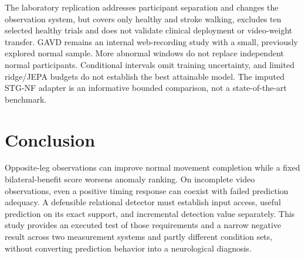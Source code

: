 \documentclass[letterpaper]{article}
\begin{document}
The laboratory replication addresses participant separation and changes the observation system, but covers only healthy and stroke walking, excludes ten selected healthy trials and does not validate clinical deployment or video-weight transfer. GAVD remains an internal web-recording study with a small, previously explored normal sample. More abnormal windows do not replace independent normal participants. Conditional intervals omit training uncertainty, and limited ridge/JEPA budgets do not establish the best attainable model. The imputed STG-NF adapter is an informative bounded comparison, not a state-of-the-art benchmark.

\section{Conclusion}

Opposite-leg observations can improve normal movement completion while a fixed bilateral-benefit score worsens anomaly ranking. On incomplete video observations, even a positive timing response can coexist with failed prediction adequacy. A defensible relational detector must establish input access, useful prediction on its exact support, and incremental detection value separately. This study provides an executed test of those requirements and a narrow negative result across two measurement systems and partly different condition sets, without converting prediction behavior into a neurological diagnosis.

\end{document}
